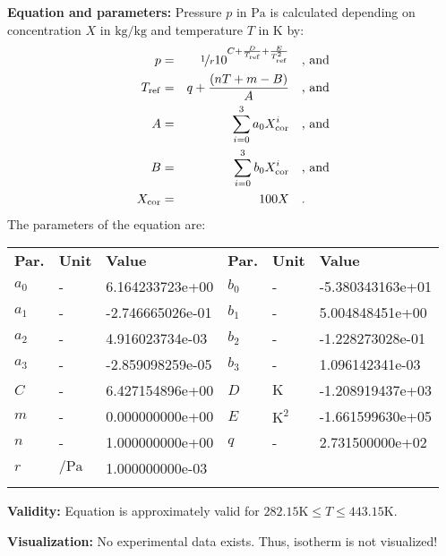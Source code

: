 \textbf{Equation and parameters:}
\newline
%
Pressure $p$ in $\si{\pascal}$ is calculated depending on concentration $X$ in $\si{\kilogram\per\kilogram}$ and  temperature $T$ in $\si{\kelvin}$ by:
%
\begin{equation*}
\begin{split}
p &=& \nicefrac{1}{r} 10 ^ { C + \frac{D}{T_\mathrm{ref}} + \frac{E}{T_\mathrm{ref}^{2}} } & \quad\text{, and} \\
T_\mathrm{ref} &=& q + \frac{\left( n T + m - B \right)}{A}  & \quad\text{, and} \\
A &=& \sum_{i=0}^{3} a_0 X_\mathrm{cor} ^{i}  & \quad\text{, and} \\
B &=& \sum_{i=0}^{3} b_0 X_\mathrm{cor} ^{i}  & \quad\text{, and} \\
X_\mathrm{cor} &=& 100 X  & \quad\text{.} \\
\end{split}
\end{equation*}
%
The parameters of the equation are:
%
\begin{longtable}[l]{lll|lll}
\toprule
\addlinespace
\textbf{Par.} & \textbf{Unit} & \textbf{Value} &	\textbf{Par.} & \textbf{Unit} & \textbf{Value} \\
\addlinespace
\midrule
\endhead

\bottomrule
\endfoot
\bottomrule
\endlastfoot
\addlinespace

$a_0$ & - & 6.164233723e+00 & $b_0$ & - & -5.380343163e+01 \\
$a_1$ & - & -2.746665026e-01 & $b_1$ & - & 5.004848451e+00 \\
$a_2$ & - & 4.916023734e-03 & $b_2$ & - & -1.228273028e-01 \\
$a_3$ & - & -2.859098259e-05 & $b_3$ & - & 1.096142341e-03 \\
$C$ & - & 6.427154896e+00 & $D$ & $\si{\kelvin}$ & -1.208919437e+03 \\
$m$ & - & 0.000000000e+00 & $E$ & $\si{\square\kelvin}$ & -1.661599630e+05 \\
$n$ & - & 1.000000000e+00 & $q$ & - & 2.731500000e+02 \\
$r$ & $\si{\per\pascal}$ & 1.000000000e-03 & & & \\

\addlinespace\end{longtable}

\textbf{Validity:}
\newline
Equation is approximately valid for $282.15 \si{\kelvin} \leq T \leq 443.15 \si{\kelvin}$.
\newline

\textbf{Visualization:}
%
\newline
No experimental data exists. Thus, isotherm is not visualized!
%

\FloatBarrier
\newpage
